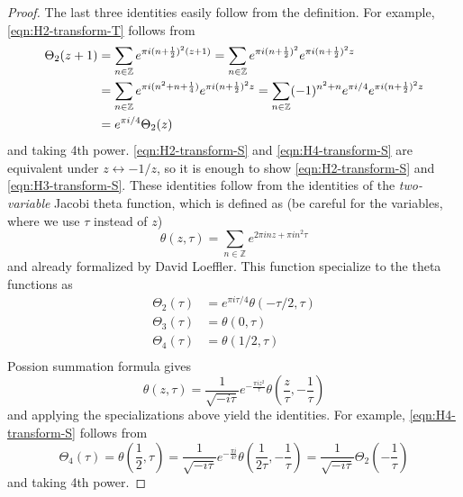 \begin{proof}\leanok
The last three identities easily follow from the definition.
For example, \eqref{eqn:H2-transform-T} follows from
\begin{align}
    \Theta_{2}(z + 1) &= \sum_{n\in\mathbb{Z}}e^{\pi i (n+\frac12)^2 (z + 1)}
    = \sum_{n \in \mathbb{Z}} e^{\pi i (n + \frac{1}{2})^{2}} e^{\pi i (n + \frac{1}{2})^{2} z} \\
    &= \sum_{n \in \mathbb{Z}} e^{\pi i (n^2 + n + \frac{1}{4})} e^{\pi i (n + \frac{1}{2})^{2} z} = \sum_{n \in \mathbb{Z}} (-1)^{n^2 + n}e^{\pi i / 4} e^{\pi i (n + \frac{1}{2})^{2} z} \\
    &= e^{\pi i / 4} \Theta_{2}(z)
\end{align}
and taking 4th power.
\eqref{eqn:H2-transform-S} and \eqref{eqn:H4-transform-S} are equivalent under $z \leftrightarrow -1/z$, so it is enough to show \eqref{eqn:H2-transform-S} and \eqref{eqn:H3-transform-S}.
These identities follow from the identities of the \emph{two-variable} Jacobi theta function, which is defined as (be careful for the variables, where we use $\tau$ instead of $z$)
\begin{equation}
    \theta(z, \tau) = \sum_{n \in \mathbb{Z}} e^{2 \pi i n z + \pi i n^2 \tau} \label{eqn:jacobi2}
\end{equation}
and already formalized by David Loeffler.
This function specialize to the theta functions as
\begin{align}
    \Theta_{2}(\tau) &= e^{\pi i \tau / 4} \theta(-\tau / 2, \tau) \label{eqn:Th2-as-jacobi2} \\
    \Theta_{3}(\tau) &= \theta(0, \tau) \label{eqn:Th3-as-jacobi2} \\
    \Theta_{4}(\tau) &= \theta(1/2, \tau) \label{eqn:Th4-as-jacobi2} \\
\end{align}
Possion summation formula gives
\begin{equation}
    \theta(z, \tau) = \frac{1}{\sqrt{-i \tau}} e^{-\frac{\pi i z^2}{\tau}} \theta\left(\frac{z}{\tau}, -\frac{1}{\tau}\right) \label{eqn:jacobi2transform}
\end{equation}
and applying the specializations above yield the identities.
For example, \eqref{eqn:H4-transform-S} follows from
\begin{equation}
    \Theta_{4}(\tau) = \theta\left(\frac{1}{2}, \tau\right) = \frac{1}{\sqrt{-i\tau}} e^{- \frac{\pi i }{4 \tau}} \theta\left(\frac{1}{2 \tau}, -\frac{1}{\tau}\right) = \frac{1}{\sqrt{-i\tau}} \Theta_{2}\left(-\frac{1}{\tau}\right)
\end{equation}
and taking 4th power.
\end{proof}

